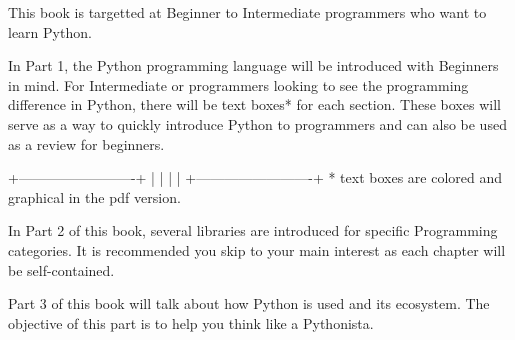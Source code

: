 This book is targetted at Beginner to Intermediate programmers who want to learn Python.

In Part 1, the Python programming language will be introduced with Beginners in mind. For Intermediate or programmers looking to see the programming difference in Python, there will be text boxes* for each section. These boxes will serve as a way to quickly introduce Python to programmers and can also be used as a review for beginners.

+-------------------------+
|                         |
|                         |
+-------------------------+
* text boxes are colored and graphical in the pdf version.


In Part 2 of this book, several libraries are introduced for specific Programming categories. It is recommended you skip to your main interest as each chapter will be self-contained.


Part 3 of this book will talk about how Python is used and its ecosystem. The objective of this part is to help you think like a Pythonista.